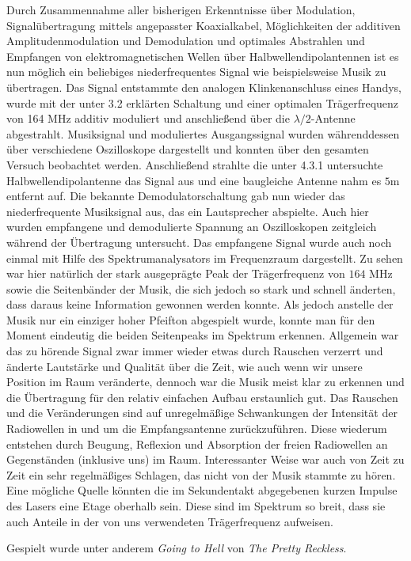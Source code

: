 	Durch Zusammennahme aller bisherigen Erkenntnisse über Modulation, Signalübertragung mittels angepasster Koaxialkabel, Möglichkeiten der additiven Amplitudenmodulation und Demodulation und optimales Abstrahlen und Empfangen von elektromagnetischen Wellen über Halbwellendipolantennen ist es nun möglich ein beliebiges niederfrequentes Signal wie beispielsweise Musik zu übertragen.
	Das Signal entstammte den analogen Klinkenanschluss eines Handys, wurde mit der unter 3.2 erklärten Schaltung und einer optimalen Trägerfrequenz von 164 MHz additiv moduliert und anschließend über die $\lambda /2$-Antenne abgestrahlt.
	Musiksignal und moduliertes Ausgangssignal wurden währenddessen über verschiedene Oszilloskope dargestellt und konnten über den gesamten Versuch beobachtet werden.
	Anschließend strahlte die unter 4.3.1 untersuchte Halbwellendipolantenne das Signal aus und eine baugleiche Antenne nahm es $5$m entfernt auf.
	Die bekannte Demodulatorschaltung gab nun wieder das niederfrequente Musiksignal aus, das ein Lautsprecher abspielte.
	Auch hier wurden empfangene und demodulierte Spannung an Oszilloskopen zeitgleich während der Übertragung untersucht. 
	Das empfangene Signal wurde auch noch einmal mit Hilfe des Spektrumanalysators im Frequenzraum dargestellt.
	Zu sehen war hier natürlich der stark ausgeprägte Peak der Trägerfrequenz von $164$ MHz sowie die Seitenbänder der Musik, die sich jedoch so stark und schnell änderten, dass daraus keine Information gewonnen werden konnte.
	Als jedoch anstelle der Musik nur ein einziger hoher Pfeifton abgespielt wurde, konnte man für den Moment eindeutig die beiden Seitenpeaks im Spektrum erkennen.
	Allgemein war das zu hörende Signal zwar immer wieder etwas durch Rauschen verzerrt und änderte Lautstärke und Qualität über die Zeit, wie auch wenn wir unsere Position im Raum veränderte, dennoch war die Musik meist klar zu erkennen und die Übertragung für den relativ einfachen Aufbau erstaunlich gut.
	Das Rauschen und die Veränderungen sind auf unregelmäßige Schwankungen der Intensität der Radiowellen in und um die Empfangsantenne zurückzuführen.
	Diese wiederum entstehen durch Beugung, Reflexion und Absorption der freien Radiowellen an Gegenständen (inklusive uns) im Raum.
	Interessanter Weise war auch von Zeit zu Zeit ein sehr regelmäßiges Schlagen, das nicht von der Musik stammte zu hören.
	Eine mögliche Quelle könnten die im Sekundentakt abgegebenen kurzen Impulse des Lasers eine Etage oberhalb sein.
	Diese sind im Spektrum so breit, dass sie auch Anteile in der von uns verwendeten Trägerfrequenz aufweisen.

	Gespielt wurde unter anderem \textit{Going to Hell} von \textit{The Pretty Reckless}.




